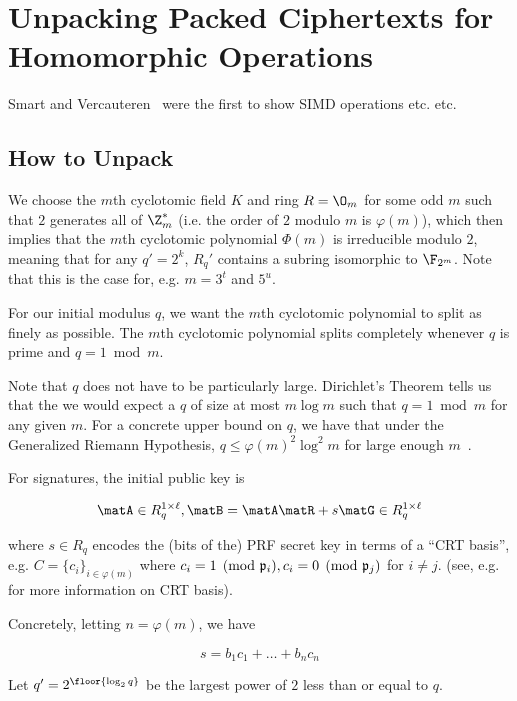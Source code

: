 \section{Unpacking Packed Ciphertexts for Homomorphic Operations}
\label{sec:unpacking}

Smart and Vercauteren~\cite{cryptoeprint:2011:133} were the first to
show SIMD operations etc. etc. 

\subsection{How to Unpack}
\label{sec:how-unpack}


We choose the $m$th cyclotomic field $K$ and ring $R=\O_m$ for some odd $m$ such that
$2$ generates all of $\Z_m^*$ (i.e. the order of $2$ modulo $m$ is
$\varphi(m)$), which then implies that the $m$th cyclotomic polynomial
$\Phi(m)$ is irreducible modulo $2$, meaning that for any $q'=2^k$,
$R_q'$ contains a subring isomorphic to $\F_{2^m}$. Note that this is
the case for, e.g. $m=3^{t}$ and $5^{u}$. 


For our initial modulus $q$, we want the $m$th cyclotomic polynomial
to split as finely as possible. The $m$th cyclotomic polynomial splits
completely whenever $q$ is prime and $q=1 \bmod{m}$. 


Note that $q$ does not have to be particularly large. Dirichlet's Theorem tells us that the we would expect a $q$ of
size at most $m\log{m}$ such that $q =1 \bmod{m}$ for any given
$m$. For a concrete upper bound on $q$, we have that under the Generalized Riemann
Hypothesis, $q \leq \varphi(m)^2\log^2{m}$ for large enough
$m$~\cite{heathbrownleastprime}.



For signatures, the initial public key is

\[\matA \in R_{q}^{1 \times \ell}, \matB=\matA\matR+s\matG \in R_q^{1 \times \ell}\]

where $s \in R_q$ encodes the (bits of the) PRF secret key in terms of a ``CRT basis'',
e.g. $C=\{c_i\}_{i \in \varphi(m)}$ where $c_i = 1 \pmod{\frak{p}_i}, c_i=0
\pmod{\frak{p}_j}$ for $i \neq j$.
(see, e.g.~\cite{DBLP:conf/eurocrypt/LyubashevskyPR13} for more
information on CRT basis). 

Concretely, letting $n = \varphi(m)$, we have

\[s = b_1c_1 + \ldots + b_{n}c_{n}\]


Let $q' = 2^{\floor{\log_2{q}}}$ be the largest power of $2$ less than
or equal to $q$.


